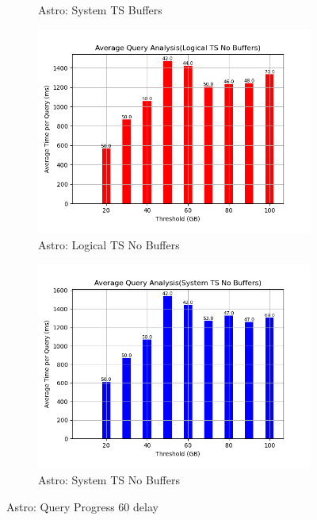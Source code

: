 \begin{figure}
\begin{subfigure}[c]{0.45\textwidth}
		\caption{Astro: System TS Buffers}
		\label{fig:system-ts-60-astro}
	\end{subfigure}
	\begin{subfigure}[c]{0.45\textwidth}
		\includegraphics[width=1\textwidth]	 {figures/Experiments/Dynamic/ASTRO/Batch_processing/60/average_query_time_per_batch_version_999777016_10485760_10_delay[60].png}
		\caption{Astro: Logical TS No Buffers}
		\label{fig:logical-ts-no-60-astro}
	\end{subfigure}
	\begin{subfigure}[c]{0.45\textwidth}
		\includegraphics[width=1\textwidth]	 {figures/Experiments/Dynamic/ASTRO/Batch_processing/60/average_query_time_per_batch_version_999777017_10485760_10_delay[60].png}
		\caption{Astro: System TS No Buffers}
		\label{fig:system-ts-no-60-astro}
	\end{subfigure}
	\caption{Astro: Query Progress 60 delay}
	\label{fig:query-progress-60-astro}
\end{figure}

